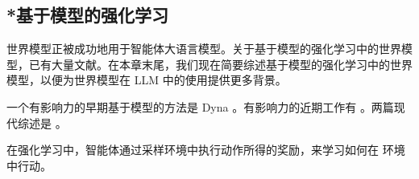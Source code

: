 \subsection{*基于模型的强化学习}\label{sec:mbrl}

世界模型正被成功地用于智能体大语言模型。关于基于模型的强化学习中的世界模型，已有大量文献。在本章末尾，我们现在简要综述基于模型的强化学习中的世界模型，以便为世界模型在 LLM 中的使用提供更多背景。

一个有影响力的早期基于模型的方法是 Dyna \citep{sutton1991dyna}。有影响力的近期工作有 \citep{ha2018world,hafner2020mastering}。两篇现代综述是 \citet{moerland2023model,plaat2023high}。

在强化学习中，智能体通过采样环境中执行动作所得的奖励，来学习如何在
环境中行动。%
%
%
%






